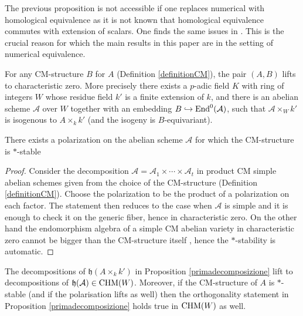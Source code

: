 \begin{remark}
\notready The previous proposition is not accessible if one replaces numerical with homological equivalence as it is not known that homological equivalence commutes with extension of scalars. One finds the same issues in \cite{Clozel}. This is the crucial reason for which the main results in this paper are in the setting of numerical equivalence.
\end{remark}
\begin{theorem}
\notready\label{HondaTate}
 For any CM-structure $B$ for $A$ (Definition \ref{definitionCM}), the pair  $(A,B)$ lifts to characteristic zero. More precisely there exists a $p$-adic field $K$ with ring of integers $W$ whose residue field $k'$ is a finite extension of $k$, and there is an abelian scheme $\mathcal{A}$ over $W$ together with an embedding $B\hookrightarrow \textnormal{End}^0(\mathcal{A})$, such that $\mathcal{A}\times_W k'$ is isogenous to $A \times_k k'$ (and the isogeny is $B$-equivariant).
 \end{theorem}

\begin{corollary}
\notready\label{CMstab}
There exists a polarization on the abelian scheme $\mathcal{A}$ for which the CM-structure is $*$-stable
\end{corollary}
\begin{proof}
Consider the decomposition $\mathcal{A}= \mathcal{A}_1\times \cdots \times \mathcal{A}_t  $ in product  CM simple abelian schemes given from the choice of the CM-structure (Definition \ref{definitionCM}). Choose the polarization to be the product of a polarization on each factor. The statement then reduces to the case when $\mathcal{A}$ is simple and it is enough to check it on the generic fiber, hence in characteristic zero. On the other hand the endomorphism algebra of a simple CM abelian variety in characteristic zero cannot be bigger than the CM-structure itself \cite[\S 22]{MumfordTata}, hence the $*$-stability is automatic.
\end{proof}


\begin{corollary}
\notready\label{lifting motives}
The decompositions of $\mathfrak{h}(A \times_k k')$ in Proposition \ref{primadecomposizione}  lift to decompositions of $\mathfrak{h}(\mathcal{A})\in  \mathrm{CHM} (W)$. Moreover, if the CM-structure of $A$ is $*$-stable (and if the polarisation lifts as well) then the orthogonality statement in Proposition \ref{primadecomposizione} holds true in $ \mathrm{CHM} (W)$ as well.
\end{corollary}

